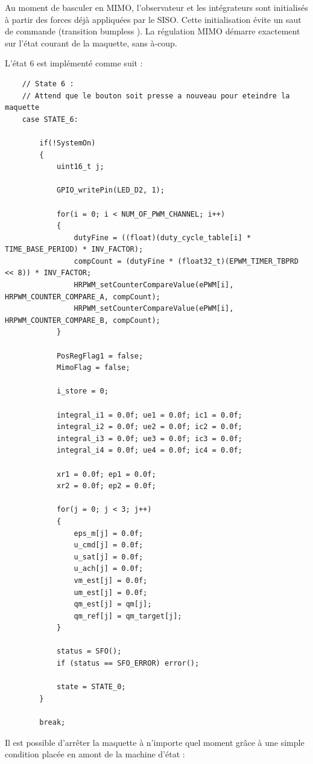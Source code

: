 Au moment de basculer en MIMO, l'observateur et les intégrateurs sont initialisés à partir des forces déjà appliquées par le SISO. Cette initialisation évite un saut de commande (transition \og bumpless \fg). La régulation MIMO démarre exactement sur l'état courant de la maquette, sans à-coup.

L'état 6 est implémenté comme suit :

\begin{verbatim}
    // State 6 :
    // Attend que le bouton soit presse a nouveau pour eteindre la maquette
    case STATE_6:

        if(!SystemOn)
        {
            uint16_t j;

            GPIO_writePin(LED_D2, 1);

            for(i = 0; i < NUM_OF_PWM_CHANNEL; i++)
            {
                dutyFine = ((float)(duty_cycle_table[i] * TIME_BASE_PERIOD) * INV_FACTOR);
                compCount = (dutyFine * (float32_t)(EPWM_TIMER_TBPRD << 8)) * INV_FACTOR;
                HRPWM_setCounterCompareValue(ePWM[i], HRPWM_COUNTER_COMPARE_A, compCount);
                HRPWM_setCounterCompareValue(ePWM[i], HRPWM_COUNTER_COMPARE_B, compCount);
            }

            PosRegFlag1 = false;
            MimoFlag = false;

            i_store = 0;

            integral_i1 = 0.0f; ue1 = 0.0f; ic1 = 0.0f;
            integral_i2 = 0.0f; ue2 = 0.0f; ic2 = 0.0f;
            integral_i3 = 0.0f; ue3 = 0.0f; ic3 = 0.0f;
            integral_i4 = 0.0f; ue4 = 0.0f; ic4 = 0.0f;

            xr1 = 0.0f; ep1 = 0.0f;
            xr2 = 0.0f; ep2 = 0.0f;

            for(j = 0; j < 3; j++)
            {
                eps_m[j] = 0.0f;
                u_cmd[j] = 0.0f;
                u_sat[j] = 0.0f;
                u_ach[j] = 0.0f;
                vm_est[j] = 0.0f;
                um_est[j] = 0.0f;
                qm_est[j] = qm[j];
                qm_ref[j] = qm_target[j];
            }

            status = SFO();
            if (status == SFO_ERROR) error();

            state = STATE_0;
        }

        break;
\end{verbatim}

Il est possible d'arrêter la maquette à n'importe quel moment grâce à une simple condition placée en amont de la machine d'état :

